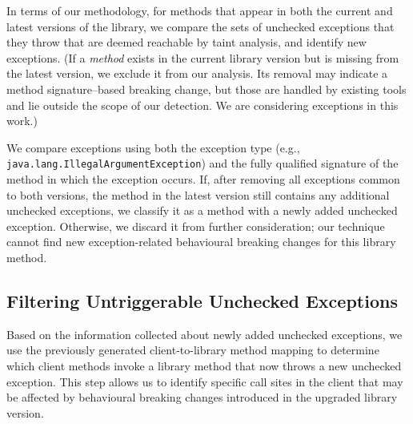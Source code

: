 

In terms of our methodology, for methods that appear in both the current and latest versions of the library, we compare the sets of unchecked exceptions that they throw that are deemed reachable by taint analysis, and identify new exceptions. (If a \emph{method} exists in the current library version but is missing from the latest version, we exclude it from our analysis. Its removal may indicate a method signature–based breaking change, but those are handled by existing tools and lie outside the scope of our detection. We are considering exceptions in this work.)

We compare exceptions using both the exception type (e.g., \texttt{java.lang.IllegalArgumentException}) and the fully qualified signature of the method in which the exception occurs. If, after removing all exceptions common to both versions, the method in the latest version still contains any additional unchecked exceptions, we classify it as a method with a newly added unchecked exception. Otherwise, we discard it from further consideration; our technique cannot find new exception-related behavioural breaking changes for this library method.

\subsection{Filtering Untriggerable Unchecked Exceptions}

Based on the information collected about newly added unchecked exceptions, we use the previously generated client-to-library method mapping to determine which client methods invoke a library method that now throws a new unchecked exception. This step allows us to identify specific call sites in the client that may be affected by behavioural breaking changes introduced in the upgraded library version.

